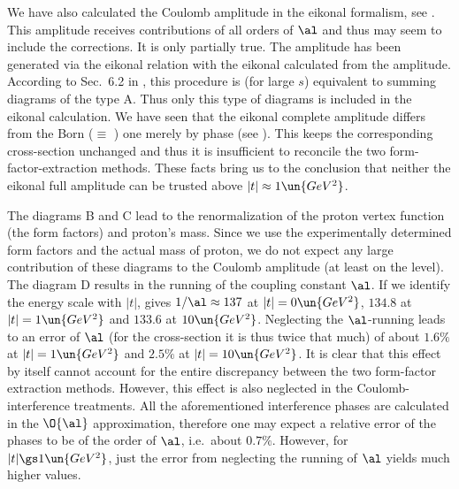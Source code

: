 We have also calculated the Coulomb amplitude in the eikonal formalism, see . This amplitude receives contributions of all orders of $\al$ and thus may seem to include the  corrections. It is only partially true. The amplitude has been generated via the eikonal relation  with the eikonal calculated from the  amplitude. According to Sec.~6.2 in , this procedure is (for large $s$) equivalent to summing diagrams of the type  A. Thus only this type of diagrams is included in the eikonal calculation. We have seen that the eikonal complete amplitude differs from the Born ($\equiv$ ) one merely by phase (see ). This keeps the corresponding cross-section unchanged and thus it is insufficient to reconcile the two form-factor-extraction methods. These facts bring us to the conclusion that neither the eikonal full amplitude can be trusted above $|t|\approx 1\un{GeV^2}$.


The diagrams  B and C lead to the renormalization of the proton vertex function (the form factors) and proton's mass. Since we use the experimentally determined form factors and the actual mass of proton, we do not expect any large contribution of these diagrams to the Coulomb amplitude (at least on the  level). The diagram D results in the running of the coupling constant $\al$. If we identify the energy scale with $|t|$,  gives $1/\al \approx 137$ at $|t| = 0\un{GeV^2}$, $134.8$ at $|t| = 1 \un{GeV^2}$ and $133.6$ at $10\un{GeV^2}$. Neglecting the $\al$-running leads to an error of $\al$ (for the cross-section it is thus twice that much) of about $1.6\percent$ at $|t| = 1 \un{GeV^2}$ and $2.5\percent$ at $|t| = 10 \un{GeV^2}$. It is clear that this effect by itself cannot account for the entire discrepancy between the two form-factor extraction methods. However, this effect is also neglected in the Coulomb-interference treatments. All the aforementioned interference phases are calculated in the $\O{\al}$ approximation, therefore one may expect a relative error of the phases to be of the order of $\al$, i.e.~about $0.7\percent$. However, for $|t| \gs 1\un{GeV^2}$, just the error from neglecting the running of $\al$ yields much higher values.

